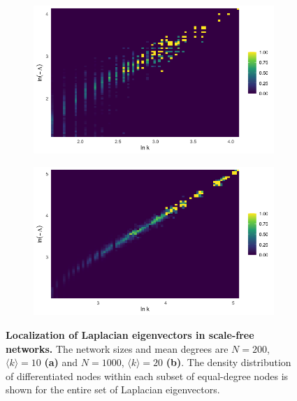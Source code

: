 \begin{figure}[H] %
  \centering
  \begin{subfigure}{0.48\textwidth}
    \centering
    \includegraphics[width=\linewidth]{Graphs/heatmap_N=200.png}
    \caption{}
  \end{subfigure}\hfill
  \begin{subfigure}{0.48\textwidth}
    \centering
    \includegraphics[width=\linewidth]{Graphs/heatmap_N=1000.png}
    \caption{}
  \end{subfigure}
  \caption{\textbf{Localization of Laplacian eigenvectors in scale-free networks.} The network sizes and mean degrees are \(N = 200\), \(\langle k\rangle = 10\) \textbf{(a)} and \(N=1000\), \(\langle k\rangle=20\) \textbf{(b)}. The density distribution of differentiated nodes within each subset of equal-degree nodes is shown for the entire set of Laplacian eigenvectors.}
  \label{fig:heatmap}
\end{figure}

